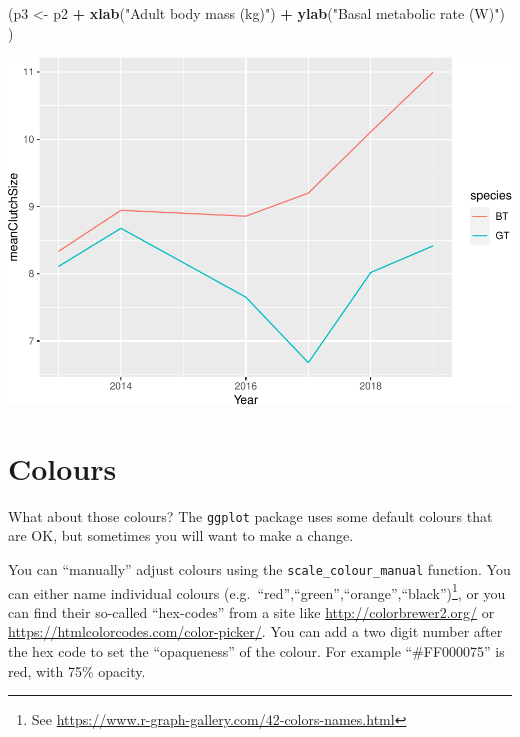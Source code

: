\documentclass[
  a4paperpaper,
]{book}
\newenvironment{Shaded}{\begin{snugshade}}{\end{snugshade}}
\newcommand{\KeywordTok}[1]{\textcolor[rgb]{0.13,0.29,0.53}{\textbf{#1}}}
\newcommand{\NormalTok}[1]{#1}
\newcommand{\OperatorTok}[1]{\textcolor[rgb]{0.81,0.36,0.00}{\textbf{#1}}}
\newcommand{\StringTok}[1]{\textcolor[rgb]{0.31,0.60,0.02}{#1}}
\begin{document}
\begin{Shaded}
\begin{Highlighting}[]
\NormalTok{(p3 \textless{}{-}}\StringTok{ }\NormalTok{p2 }\OperatorTok{+}\StringTok{ }
\StringTok{  }\KeywordTok{xlab}\NormalTok{(}\StringTok{"Adult body mass (kg)"}\NormalTok{) }\OperatorTok{+}\StringTok{ }
\StringTok{  }\KeywordTok{ylab}\NormalTok{(}\StringTok{"Basal metabolic rate (W)"}\NormalTok{)}
\NormalTok{)}
\end{Highlighting}
\end{Shaded}

\begin{center}\includegraphics{BB852_files/figure-latex/unnamed-chunk-116-1} \end{center}

\hypertarget{colours}{%
\section{Colours}\label{colours}}

What about those colours? The \texttt{ggplot} package uses some default colours that are OK, but sometimes you will want to make a change.

You can ``manually'' adjust colours using the \texttt{scale\_colour\_manual} function. You can either name individual colours (e.g.~``red'',``green'',``orange'',``black'')\footnote{See \url{https://www.r-graph-gallery.com/42-colors-names.html}}, or you can find their so-called ``hex-codes'' from a site like \url{http://colorbrewer2.org/} or \url{https://htmlcolorcodes.com/color-picker/}. You can add a two digit number after the hex code to set the ``opaqueness'' of the colour. For example ``\#FF000075'' is red, with 75\% opacity.
\end{document}
